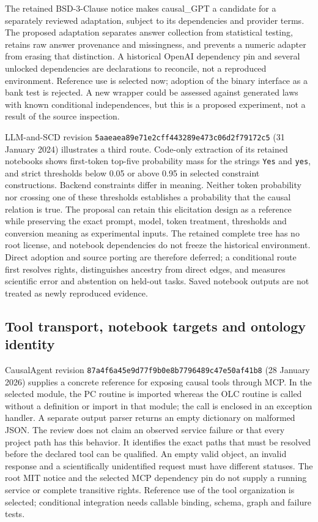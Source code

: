 The retained BSD-3-Clause notice makes causal\_GPT a candidate for a separately
reviewed adaptation, subject to its dependencies and provider terms. The
proposed adaptation separates answer collection from statistical testing,
retains raw answer provenance and missingness, and prevents a numeric adapter
from erasing that distinction. A historical OpenAI dependency pin and several
unlocked dependencies are declarations to reconcile, not a reproduced
environment. Reference use is selected now; adoption of the binary interface
as a bank test is rejected. A new wrapper could be assessed against generated
laws with known conditional independences, but this is a proposed experiment,
not a result of the source inspection.~\citep{exec14_iid_gpt,exec25_agents_choice}

LLM-and-SCD revision
\texttt{5aaeaea89e71e2cff443}\allowbreak\texttt{289e473c06d2f79172c5}
(31 January 2024) illustrates a third route. Code-only extraction of its
retained notebooks shows first-token top-five probability mass for the strings
\texttt{Yes} and \texttt{yes}, and strict thresholds below 0.05 or above 0.95
in selected constraint constructions. Backend constraints differ in meaning.
Neither token probability nor crossing one of these thresholds establishes a
probability that the causal relation is true. The proposal can retain this
elicitation design as a reference while preserving the exact prompt, model,
token treatment, thresholds and conversion meaning as experimental inputs.
The retained complete tree has no root license, and notebook dependencies do
not freeze the historical environment. Direct adoption and source porting are
therefore deferred; a conditional route first resolves rights, distinguishes
ancestry from direct edges, and measures scientific error and abstention on
held-out tasks. Saved notebook outputs are not treated as newly reproduced
evidence.~\citep{exec14_iid_scd,exec25_agents_choice}

\subsection{Tool transport, notebook targets and ontology identity}
CausalAgent revision
\texttt{87a4f6a45e9d77f9b0e8}\allowbreak\texttt{b7796489c47e50af41b8}
(28 January 2026) supplies a concrete reference for exposing causal tools through
MCP. In the selected module, the PC routine is imported whereas the OLC routine
is called without a definition or import in that module; the call is enclosed
in an exception handler. A separate output parser returns an empty dictionary
on malformed JSON. The review does not claim an observed service failure or
that every project path has this behavior. It identifies the exact paths that
must be resolved before the declared tool can be qualified. An empty valid
object, an invalid response and a scientifically unidentified request must have
different statuses. The root MIT notice and the selected MCP dependency pin do
not supply a running service or complete transitive rights. Reference use of
the tool organization is selected; conditional integration needs callable
binding, schema, graph and failure tests.~\citep{exec13_data_causalagent_code,exec25_agents_choice}

